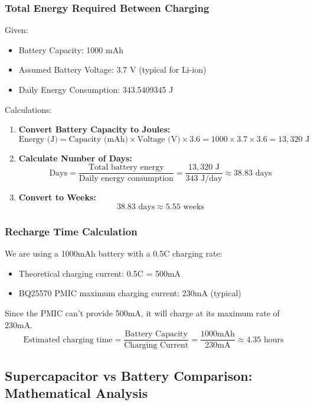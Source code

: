 \documentclass[a4paper,11pt]{article}%
\begin{document}
\subsubsection{Total Energy Required Between Charging}
Given:
\begin{itemize}
\item Battery Capacity: 1000 mAh
\item Assumed Battery Voltage: 3.7 V (typical for Li-ion)
\item Daily Energy Consumption: 343.5409345 J
\end{itemize}
Calculations:
\begin{enumerate}
\item \textbf{Convert Battery Capacity to Joules:}
\begin{equation}
\text{Energy (J)} = \text{Capacity (mAh)} \times \text{Voltage (V)} \times 3.6
= 1000 \times 3.7 \times 3.6 = 13,320 \text{ J}
\end{equation}
\item \textbf{Calculate Number of Days:}
\begin{equation}
\text{Days} = \frac{\text{Total battery energy}}{\text{Daily energy consumption}}
= \frac{13,320 \text{ J}}{343 \text{ J/day}} \approx 38.83 \text{ days}
\end{equation}
\item \textbf{Convert to Weeks:}
\begin{equation}
38.83 \text{ days} \approx 5.55 \text{ weeks}
\end{equation}
\end{enumerate}
\subsubsection{Recharge Time Calculation}
We are using a 1000mAh battery with a 0.5C charging rate:
\begin{itemize}
\item Theoretical charging current: 0.5C = 500mA
\item BQ25570 PMIC maximum charging current: 230mA (typical)
\end{itemize}
Since the PMIC can't provide 500mA, it will charge at its maximum rate of 230mA.
\begin{equation}
\text{Estimated charging time} = \frac{\text{Battery Capacity}}{\text{Charging Current}}
= \frac{1000\text{mAh}}{230\text{mA}} \approx 4.35 \text{ hours}
\end{equation}


\subsection{Supercapacitor vs Battery Comparison: Mathematical Analysis}
\end{document}
